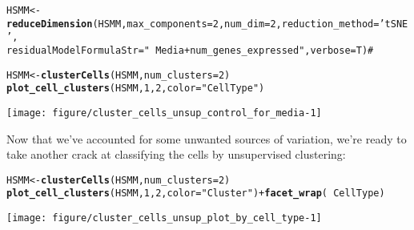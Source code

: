 \documentclass[10pt,oneside]{article}\usepackage[]{graphicx}\usepackage[]{color}
\makeatletter
\def\maxwidth{ %
  \ifdim\Gin@nat@width>\linewidth
    \linewidth
  \else
    \Gin@nat@width
  \fi
}
\newcommand{\hlnum}[1]{\textcolor[rgb]{0.686,0.059,0.569}{#1}}%
\newcommand{\hlstr}[1]{\textcolor[rgb]{0.192,0.494,0.8}{#1}}%
\newcommand{\hlcom}[1]{\textcolor[rgb]{0.678,0.584,0.686}{\textit{#1}}}%
\newcommand{\hlopt}[1]{\textcolor[rgb]{0,0,0}{#1}}%
\newcommand{\hlstd}[1]{\textcolor[rgb]{0.345,0.345,0.345}{#1}}%
\newcommand{\hlkwb}[1]{\textcolor[rgb]{0.69,0.353,0.396}{#1}}%
\newcommand{\hlkwc}[1]{\textcolor[rgb]{0.333,0.667,0.333}{#1}}%
\newcommand{\hlkwd}[1]{\textcolor[rgb]{0.737,0.353,0.396}{\textbf{#1}}}%
\newenvironment{kframe}{%
 \def\at@end@of@kframe{}%
 \ifinner\ifhmode%
  \def\at@end@of@kframe{\end{minipage}}%
  \begin{minipage}{\columnwidth}%
 \fi\fi%
 \def\FrameCommand##1{\hskip\@totalleftmargin \hskip-\fboxsep
 \colorbox{shadecolor}{##1}\hskip-\fboxsep
     \hskip-\linewidth \hskip-\@totalleftmargin \hskip\columnwidth}%
 \MakeFramed {\advance\hsize-\width
   \@totalleftmargin\z@ \linewidth\hsize
   \@setminipage}}%
 {\par\unskip\endMakeFramed%
 \at@end@of@kframe}
\newenvironment{knitrout}{}{} %
\makeatother
\begin{document}
\begin{knitrout}
\color{fgcolor}\begin{kframe}
\begin{alltt}
\hlstd{HSMM} \hlkwb{<-} \hlkwd{reduceDimension}\hlstd{(HSMM,} \hlkwc{max_components}\hlstd{=}\hlnum{2}\hlstd{,} \hlkwc{num_dim} \hlstd{=} \hlnum{2}\hlstd{,} \hlkwc{reduction_method} \hlstd{=} \hlstr{'tSNE'}\hlstd{,}
                       \hlkwc{residualModelFormulaStr}\hlstd{=}\hlstr{"~Media + num_genes_expressed"}\hlstd{,} \hlkwc{verbose} \hlstd{= T)} \hlcom{#}
\end{alltt}


{\ttfamily\noindent\itshape\color{messagecolor}{\#\# Removing batch effects}}

{\ttfamily\noindent\itshape\color{messagecolor}{\#\# Remove noise by PCA ...}}

{\ttfamily\noindent\itshape\color{messagecolor}{\#\# Reduce dimension by tSNE ...}}\begin{alltt}
\hlstd{HSMM} \hlkwb{<-} \hlkwd{clusterCells}\hlstd{(HSMM,} \hlkwc{num_clusters}\hlstd{=}\hlnum{2}\hlstd{)}
\hlkwd{plot_cell_clusters}\hlstd{(HSMM,} \hlnum{1}\hlstd{,} \hlnum{2}\hlstd{,} \hlkwc{color}\hlstd{=}\hlstr{"CellType"}\hlstd{)}
\end{alltt}
\end{kframe}

{\centering \texttt{[image: figure/cluster\_cells\_unsup\_control\_for\_media-1]} 

}



\end{knitrout}

Now that we've accounted for some unwanted sources of variation, we're ready to take another crack at classifying the cells by unsupervised clustering:

\begin{knitrout}
\color{fgcolor}\begin{kframe}
\begin{alltt}
\hlstd{HSMM} \hlkwb{<-} \hlkwd{clusterCells}\hlstd{(HSMM,} \hlkwc{num_clusters}\hlstd{=}\hlnum{2}\hlstd{)}
\hlkwd{plot_cell_clusters}\hlstd{(HSMM,} \hlnum{1}\hlstd{,} \hlnum{2}\hlstd{,} \hlkwc{color}\hlstd{=}\hlstr{"Cluster"}\hlstd{)} \hlopt{+} \hlkwd{facet_wrap}\hlstd{(}\hlopt{~}\hlstd{CellType)}
\end{alltt}
\end{kframe}

{\centering \texttt{[image: figure/cluster\_cells\_unsup\_plot\_by\_cell\_type-1]} 

}



\end{knitrout}
 
\end{document}
